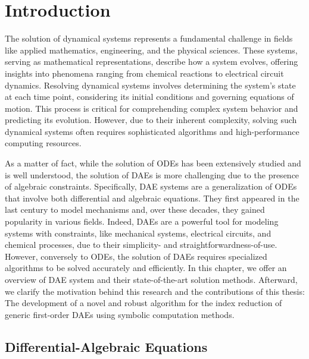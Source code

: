 
\chapter{Introduction}
\label{chap1:introduction}

The solution of dynamical systems represents a fundamental challenge in fields like applied mathematics, engineering, and the physical sciences. These systems, serving as mathematical representations, describe how a system evolves, offering insights into phenomena ranging from chemical reactions to electrical circuit dynamics. Resolving dynamical systems involves determining the system's state at each time point, considering its initial conditions and governing equations of motion. This process is critical for comprehending complex system behavior and predicting its evolution. However, due to their inherent complexity, solving such dynamical systems often requires sophisticated algorithms and high-performance computing resources.

As a matter of fact, while the solution of \acp{ODE} has been extensively studied and is well understood, the solution of \acp{DAE} is more challenging due to the presence of algebraic constraints. Specifically, \ac{DAE} systems are a generalization of \acp{ODE} that involve both differential and algebraic equations. They first appeared in the last century to model mechanisms and, over these decades, they gained popularity in various fields. Indeed, \acp{DAE} are a powerful tool for modeling systems with constraints, like mechanical systems, electrical circuits, and chemical processes, due to their simplicity- and straightforwardness-of-use. However, conversely to \acp{ODE}, the solution of \acp{DAE} requires specialized algorithms to be solved accurately and efficiently. In this chapter, we offer an overview of \ac{DAE} system and their state-of-the-art solution methods. Afterward, we clarify the motivation behind this research and the contributions of this thesis: The development of a novel and robust algorithm for the index reduction of generic first-order \acp{DAE} using symbolic computation methods.


\section{Differential-Algebraic Equations}

